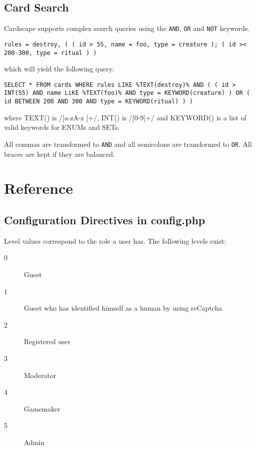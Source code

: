 \documentclass[a4paper, 11pt]{scrbook}
\begin{document}
\appendix
\section{Card Search}
Cardscape supports complex search queries using the \texttt{AND}, \texttt{OR} and \texttt{NOT} keywords.
\begin{verbatim}
rules = destroy, ( ( id > 55, name = foo, type = creature ); ( id >< 200-300, type = ritual ) )
\end{verbatim}
which will yield the following query:
\begin{verbatim}
SELECT * FROM cards WHERE rules LIKE %TEXT(destroy)% AND ( ( id > INT(55) AND name LiKE %TEXT(foo)% AND type = KEYWORD(creature) ) OR ( id BETWEEN 200 AND 300 AND type = KEYWORD(ritual) ) )
\end{verbatim}
where TEXT() is /[a-zA-z ]+/, INT() is /[0-9]+/ and KEYWORD() is a list of valid keywords for ENUMs and SETs.

All commas are transformed to \texttt{AND} and all semicolons are transformed to \texttt{OR}. All braces are kept if they are balanced.
\chapter{Reference}
\section{Configuration Directives in config.php}\label{configExplain}
Level values correspond to the role a user has. The following levels exist:
\begin{description}
 \item[0] Guest
 \item[1] Guest who has identified himself as a human by using reCaptcha
 \item[2] Registered user
 \item[3] Moderator
 \item[4] Gamemaker
 \item[5] Admin
\end{description}

\newcommand{\boolval}[0]{(\texttt{true}\textbar \texttt{false})}
\end{document}

